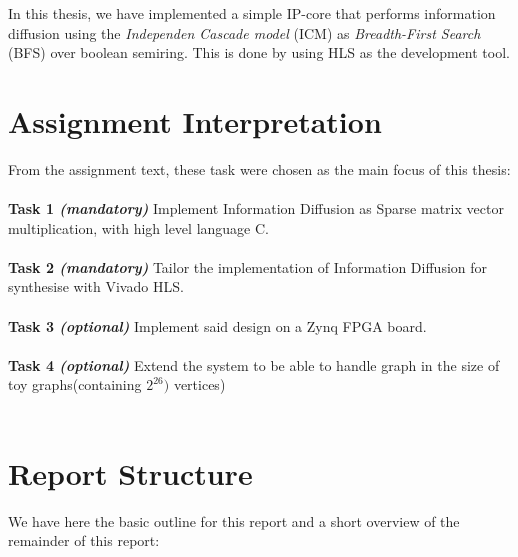 In this thesis, we have implemented a simple IP-core that performs information diffusion using the \textit{Independen Cascade model} (ICM) as \textit{Breadth-First Search} (BFS) over boolean semiring. This is done by using HLS as the development tool. 


\section{Assignment Interpretation}
From the assignment text, these task were chosen as the main focus of this thesis:\\ \hfil \\ \hfil
\textbf{Task 1 \textit{(mandatory)}} Implement Information Diffusion as Sparse matrix vector multiplication, with high level language C.  \\ \hfil \\ \hfil
\textbf{Task 2 \textit{(mandatory)}} Tailor the implementation of Information Diffusion for synthesise with Vivado HLS.   \\ \hfil \\ \hfil
\textbf{Task 3 \textit{(optional)}} Implement said design on a  Zynq FPGA board. \\ \hfil \\ \hfil
\textbf{Task 4 \textit{(optional)}} Extend the system to be able to handle graph in the size of toy graphs(containing $2^{26})$ vertices) \\ \hfil \\ \hfil


\section{Report Structure}
We have here the basic outline for this report and a short overview of the remainder of this report:\\ \hfill

